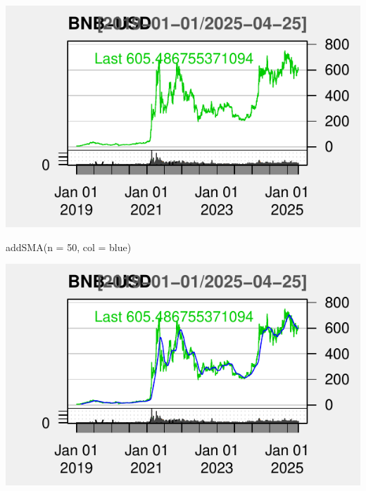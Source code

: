 \documentclass[]{tufte-handout}
\newenvironment{Shaded}{}{}
\newcommand{\AttributeTok}[1]{\textcolor[rgb]{0.49,0.56,0.16}{#1}}
\newcommand{\DecValTok}[1]{\textcolor[rgb]{0.25,0.63,0.44}{#1}}
\newcommand{\FunctionTok}[1]{\textcolor[rgb]{0.02,0.16,0.49}{#1}}
\newcommand{\NormalTok}[1]{#1}
\newcommand{\StringTok}[1]{\textcolor[rgb]{0.25,0.44,0.63}{#1}}
\begin{document}
\includegraphics{cripto_update_files/figure-latex/unnamed-chunk-8-1}

\begin{Shaded}
\begin{Highlighting}[]
\FunctionTok{addSMA}\NormalTok{(}\AttributeTok{n =} \DecValTok{50}\NormalTok{, }\AttributeTok{col =} \StringTok{\textquotesingle{}blue\textquotesingle{}}\NormalTok{)}
\end{Highlighting}
\end{Shaded}

\includegraphics{cripto_update_files/figure-latex/unnamed-chunk-8-2}
\end{document}
